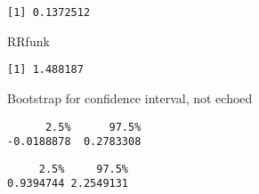 \documentclass[
  letterpaper,
  DIV=11,
  numbers=noendperiod]{scrartcl}
\newenvironment{Shaded}{\begin{snugshade}}{\end{snugshade}}
\newcommand{\NormalTok}[1]{\textcolor[rgb]{0.00,0.23,0.31}{#1}}
\begin{document}
\begin{verbatim}
[1] 0.1372512
\end{verbatim}

\begin{Shaded}
\begin{Highlighting}[]
\NormalTok{RRfunk}
\end{Highlighting}
\end{Shaded}

\begin{verbatim}
[1] 1.488187
\end{verbatim}

Bootstrap for confidence interval, not echoed

\begin{verbatim}
      2.5%      97.5% 
-0.0188878  0.2783308 
\end{verbatim}

\begin{verbatim}
     2.5%     97.5% 
0.9394744 2.2549131 
\end{verbatim}
\end{document}
